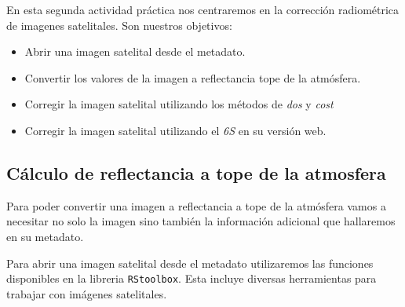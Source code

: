 
En esta segunda actividad pr\'actica nos centraremos en la correcci\'on radiom\'etrica
de imagenes satelitales. Son nuestros objetivos:

\begin{itemize}
    \item Abrir una imagen satelital desde el metadato.
    \item Convertir los valores de la imagen a reflectancia tope de la
        atm\'osfera.
    \item Corregir la imagen satelital utilizando los m\'etodos de \emph{dos} y
        \emph{cost}
    \item Corregir la imagen satelital utilizando el \emph{6S} en su versi\'on web.
\end{itemize}

\subsection{C\'alculo de reflectancia a tope de la atmosfera}

Para poder convertir una imagen a reflectancia a tope de la atm\'osfera vamos a
necesitar no solo la imagen sino tambi\'en la informaci\'on adicional que hallaremos
en su metadato.

Para abrir una imagen satelital desde el metadato utilizaremos las funciones
disponibles en la libreria \texttt{RStoolbox}. Esta incluye diversas herramientas
para trabajar con im\'agenes satelitales.

